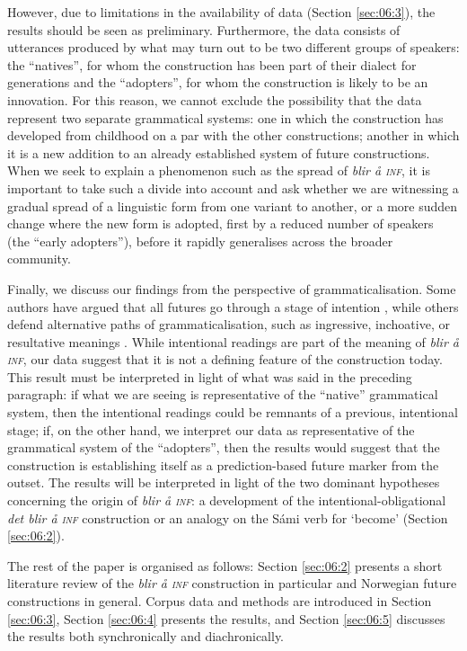 \documentclass[output=paper,colorlinks,citecolor=brown]{langscibook}
\begin{document}
However, due to limitations in the availability of data (Section \ref{sec:06:3}), the results should be seen as preliminary. Furthermore, the data consists of utterances produced by what may turn out to be two different groups of speakers: the “natives”, for whom the construction has been part of their dialect for generations and the “adopters”, for whom the construction is likely to be an innovation. For this reason, we cannot exclude the possibility that the data represent two separate grammatical systems: one in which the construction has developed from childhood on a par with the other constructions; another in which it is a new addition to an already established system of future constructions. When we seek to explain a phenomenon such as the spread of \textit{blir å \textsc{inf}}, it is important to take such a divide into account and ask whether we are witnessing a gradual spread of a linguistic form from one variant to another, or a more sudden change where the new form is adopted, first by a reduced number of speakers (the “early adopters”), before it rapidly generalises across the broader community.

Finally, we discuss our findings from the perspective of grammaticalisation. Some authors have argued that all futures go through a stage of intention \citep{BybeePerkinsPagliuca1994, Heine1995}, while others defend alternative paths of grammaticalisation, such as ingressive, inchoative, or resultative meanings \citep{Traugott1978, Dahl2000}. While intentional readings are part of the meaning of \textit{blir å \textsc{inf}}, our data suggest that it is not a defining feature of the construction today. This result must be interpreted in light of what was said in the preceding paragraph: if what we are seeing is representative of the “native” grammatical system, then the intentional readings could be remnants of a previous, intentional stage; if, on the other hand, we interpret our data as representative of the grammatical system of the “adopters”, then the results would suggest that the construction is establishing itself as a prediction-based future marker from the outset. The results will be interpreted in light of the two dominant hypotheses concerning the origin of \textit{blir å \textsc{inf}}: a development of the intentional-obligational \textit{det blir å \textsc{inf}} construction or an analogy on the Sámi verb for ‘become’ (Section \ref{sec:06:2}).

The rest of the paper is organised as follows: Section \ref{sec:06:2} presents a short literature review of the \textit{blir å \textsc{inf}} construction in particular and Norwegian future constructions in general. Corpus data and methods are introduced in Section \ref{sec:06:3}, Section \ref{sec:06:4} presents the results, and Section \ref{sec:06:5} discusses the results both synchronically and diachronically.
\end{document}
